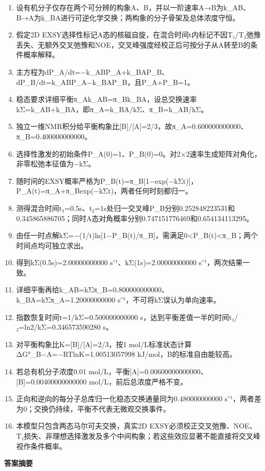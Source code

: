 \documentclass[UTF8,11pt,a4paper]{ctexart}
\begin{document}
\begin{enumerate}
\item 设有机分子仅存在两个可分辨的构象A、B，并以一阶速率A→B为k\_AB、B→A为k\_BA进行可逆化学交换；两构象的分子骨架及总体浓度守恒。
\item 假定2D EXSY选择性标记A态的核磁自旋，在混合时间t内标记不因T₁/T₂弛豫丢失、无额外交叉弛豫和NOE，交叉峰强度经校正后可按分子从A转至B的条件概率解释。
\item 主方程为dP\_A/dt=−k\_ABP\_A+k\_BAP\_B、dP\_B/dt=k\_ABP\_A−k\_BAP\_B，且P\_A+P\_B=1。
\item 稳态要求详细平衡π\_Ak\_AB=π\_Bk\_BA，设总交换速率kΣ=k\_AB+k\_BA，即π\_A=k\_BA/kΣ、π\_B=k\_AB/kΣ。
\item 独立一维NMR积分给平衡构象比[B]/[A]=2/3，故π\_A=0.600000000000、π\_B=0.400000000000。
\item 选择性激发的初始条件P\_A(0)=1、P\_B(0)=0。对2×2速率生成矩阵对角化，非零松弛本征值为−kΣ。
\item 随时间的EXSY概率严格为P\_B(t)=π\_B[1−exp(−kΣt)]，P\_A(t)=π\_A+π\_Bexp(−kΣt)，两者任何时刻都归一。
\item 测得混合时间t₁=0.5s、t₂=1s处归一交叉峰P\_B分别0.252848223531和0.345865886705；同时A态对角概率分别0.747151776469和0.654134113295。
\item 由任一时点解kΣ=−(1/t)ln[1−P\_B(t)/π\_B]，需满足0<P\_B(t)<π\_B；两个时间点均可独立求出。
\item 得到kΣ(0.5s)=2.00000000000 s⁻¹、kΣ(1s)=2.00000000000 s⁻¹，两次结果一致。
\item 详细平衡再给k\_AB=kΣπ\_B=0.800000000000、k\_BA=kΣπ\_A=1.20000000000 s⁻¹，不可将kΣ误认为单向速率。
\item 指数恢复时间τ=1/kΣ=0.500000000000 s，达到平衡差值一半的时间t₁/₂=ln2/kΣ=0.346573590280 s。
\item 对平衡构象比K=[B]/[A]=2/3，按1 mol/L标准状态计算ΔG°\_B−A=−RTlnK=1.00513057998 kJ/mol，B的标准自由能较高。
\item 若总有机分子浓度0.01 mol/L，平衡[A]=0.00600000000000、[B]=0.00400000000000 mol/L，前后总浓度严格不变。
\item 正向和逆向的每分子总库归一化稳态交换通量同为0.480000000000 s⁻¹，两者差为0；交换仍持续，平衡不代表无微观交换事件。
\item 本模型只包含两态马尔可夫交换，真实2D EXSY必须校正交叉弛豫、NOE、T₁损失、非理想选择激发及多个中间构象；若这些效应显著不能直接将交叉峰视作条件概率。
\end{enumerate}
\noindent\textbf{答案摘要}\par
\end{document}
